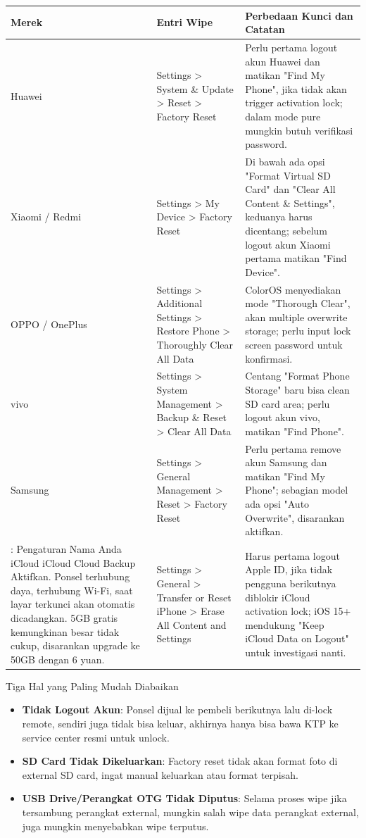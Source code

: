 \begin{center}
\begin{tabularx}{\linewidth}{|X|X|X|}
\hline
\textbf{Merek} & \textbf{Entri Wipe} & \textbf{Perbedaan Kunci dan Catatan} \tabularnewline
\hline
Huawei & Settings > System \& Update > Reset > Factory Reset & Perlu pertama logout akun Huawei dan matikan "Find My Phone", jika tidak akan trigger activation lock; dalam mode pure mungkin butuh verifikasi password. \tabularnewline
Xiaomi / Redmi & Settings > My Device > Factory Reset & Di bawah ada opsi "Format Virtual SD Card" dan "Clear All Content \& Settings", keduanya harus dicentang; sebelum logout akun Xiaomi pertama matikan "Find Device". \tabularnewline
OPPO / OnePlus & Settings > Additional Settings > Restore Phone > Thoroughly Clear All Data & ColorOS menyediakan mode "Thorough Clear", akan multiple overwrite storage; perlu input lock screen password untuk konfirmasi. \tabularnewline
vivo & Settings > System Management > Backup \& Reset > Clear All Data & Centang "Format Phone Storage" baru bisa clean SD card area; perlu logout akun vivo, matikan "Find Phone". \tabularnewline
Samsung & Settings > General Management > Reset > Factory Reset & Perlu pertama remove akun Samsung dan matikan "Find My Phone"; sebagian model ada opsi "Auto Overwrite", disarankan aktifkan. \tabularnewline
: Pengaturan Nama Anda iCloud iCloud Cloud Backup Aktifkan. Ponsel terhubung daya, terhubung Wi-Fi, saat layar terkunci akan otomatis dicadangkan. 5GB gratis kemungkinan besar tidak cukup, disarankan upgrade ke 50GB dengan 6 yuan. & Settings > General > Transfer or Reset iPhone > Erase All Content and Settings & Harus pertama logout Apple ID, jika tidak pengguna berikutnya diblokir iCloud activation lock; iOS 15+ mendukung "Keep iCloud Data on Logout" untuk investigasi nanti. \tabularnewline
\hline
\end{tabularx}
\end{center}

\begin{tcbwarn}{Tiga Hal yang Paling Mudah Diabaikan}
\begin{itemize}
  \item \textbf{Tidak Logout Akun}: Ponsel dijual ke pembeli berikutnya lalu di-lock remote, sendiri juga tidak bisa keluar, akhirnya hanya bisa bawa KTP ke service center resmi untuk unlock.
  \item \textbf{SD Card Tidak Dikeluarkan}: Factory reset tidak akan format foto di external SD card, ingat manual keluarkan atau format terpisah.
  \item \textbf{USB Drive/Perangkat OTG Tidak Diputus}: Selama proses wipe jika tersambung perangkat external, mungkin salah wipe data perangkat external, juga mungkin menyebabkan wipe terputus.
\end{itemize}

\end{tcbwarn}

